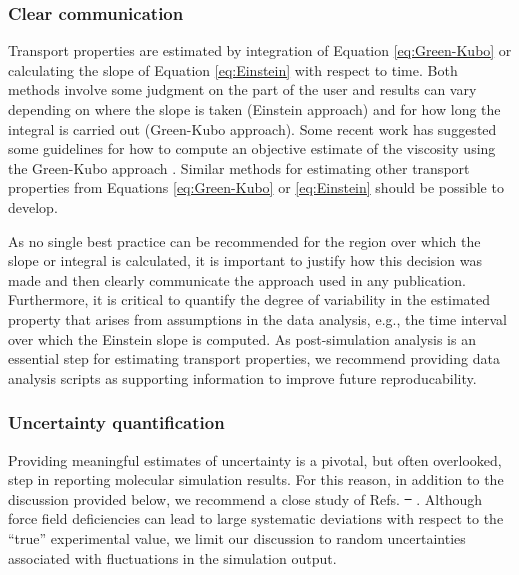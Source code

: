 \documentclass[9pt,bestpractices]{livecoms}
\providecommand{\DIFadd}[1]{{\protect\color{blue}\uwave{#1}}} %
\providecommand{\DIFdel}[1]{{\protect\color{red}\sout{#1}}}                      %
\providecommand{\DIFaddbegin}{} %
\providecommand{\DIFaddend}{} %
\providecommand{\DIFdelbegin}{} %
\providecommand{\DIFdelend}{} %
\begin{document}
\subsubsection{Clear communication} \label{sec:General: Clear communication}

Transport properties are estimated by integration of Equation \ref{eq:Green-Kubo} or calculating the slope of Equation \ref{eq:Einstein} with respect to time. Both methods involve some judgment on the part of the user and results can vary depending on where the slope is taken (Einstein approach) and for how long the integral is carried out (Green-Kubo approach). Some recent work has suggested some guidelines for how to compute an objective estimate of the viscosity using the Green-Kubo approach \cite{Zhang2015}. Similar methods for estimating other transport properties from Equations \ref{eq:Green-Kubo} or \ref{eq:Einstein} should be possible to develop. 

As no single best practice can be recommended for the region over which the slope or integral is calculated, it is important to justify how this decision was made and then clearly communicate the approach used in any publication. Furthermore, it is critical to quantify the degree of variability in the estimated property that arises from assumptions in the data analysis, e.g., the time interval over which the Einstein slope is computed. As post-simulation analysis is an essential step for estimating transport properties, we recommend providing data analysis scripts as supporting information to improve future reproducability.

\subsubsection{Uncertainty quantification} \label{sec:General: Uncertainty}

Providing meaningful estimates of uncertainty is a pivotal, but often overlooked, step in reporting molecular simulation results. For this reason, in addition to the discussion provided below, we recommend a close study of Refs. \DIFdelbegin \DIFdel{\mbox{%
}\hspace{0pt}%
}\DIFdelend \DIFaddbegin \DIFadd{\mbox{%
\cite{GUM} }\hspace{0pt}%
and \mbox{%
\cite{Grossfield2018}}\hspace{0pt}%
}\DIFaddend . Although force field deficiencies can lead to large systematic deviations with respect to the ``true'' experimental value, we limit our discussion to random uncertainties associated with fluctuations in the simulation output.
\end{document}
